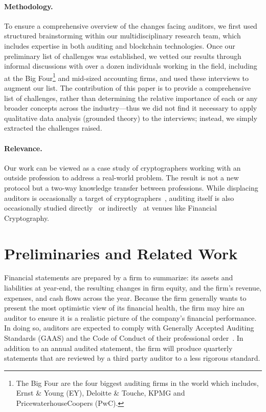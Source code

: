 \paragraph{\textbf{Methodology.}} To ensure a comprehensive overview of the changes facing auditors, we first used structured brainstorming within our multidisciplinary research team, which includes expertise in both auditing and blockchain technologies. Once our preliminary list of challenges was established, we vetted our results through informal discussions with over a dozen individuals working in the field, including at the Big Four\footnote{The Big Four are the four biggest auditing firms in the world which includes, Ernst \& Young (EY), Deloitte \& Touche, KPMG and PricewaterhouseCoopers (PwC).} and mid-sized accounting firms, and used these interviews to augment our list. The contribution of this paper is to provide a comprehensive list of challenges, rather than determining the relative importance of each or any broader concepts across the industry---thus we did not find it necessary to apply qualitative data analysis (\eg grounded theory) to the interviews; instead, we simply extracted the challenges raised.

\paragraph{\textbf{Relevance.}} Our work can be viewed as a case study of cryptographers working with an outside profession to address a real-world problem. The result is not a new protocol but a two-way knowledge transfer between professions. While displacing auditors is occasionally a target of cryptographers~\cite{dagher2015provisions,narula2018zkledger}, auditing itself is also occasionally studied directly~\cite{grigg2000financial} or indirectly~\cite{Swi97,BFS98} at venues like Financial Cryptography.


\section{Preliminaries and Related Work}
Financial statements are prepared by a firm to summarize: its assets and liabilities at year-end, the resulting changes in firm equity, and the firm{'}s revenue, expenses, and cash flows across the year. Because the firm generally wants to present the most optimistic view of its financial health, the firm may hire an auditor to ensure it is a realistic picture of the company{'}s financial performance. In doing so, auditors are expected to comply with Generally Accepted Auditing Standards (GAAS) and the Code of Conduct of their professional order~\cite{strother1975establishment}. In addition to an annual audited statement, the firm will produce quarterly statements that are reviewed by a third party auditor to a less rigorous standard.

